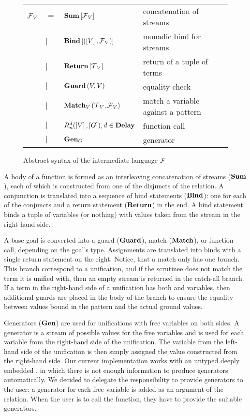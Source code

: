 \begin{figure}[h]
\begin{tabular}{llll}
    $\operatorname{\mathcal{F}}_{V}$ & $=$ & $\operatorname{\mathbf{Sum}}\left[ \operatorname{\mathcal{F}}_{V} \right]$ & concatenation of streams\\
               & $\mid$ & $\operatorname{\mathbf{Bind}}\left[ \left(\left[ V \right], \operatorname{\mathcal{F}}_{V}\right) \right] $ & monadic bind for streams\\
               & $\mid$ & $\operatorname{\mathbf{Return}} \left[ \operatorname{\mathcal{T}}_{V} \right]$ & return of a tuple of terms\\
               & $\mid$ & $\operatorname{\mathbf{Guard}}\left( V, V \right)$ & equality check\\
               & $\mid$ & $\operatorname{\mathbf{Match}}_{V} \left( \operatorname{\mathcal{T}}_{V}, \operatorname{\mathcal{F}}_{V} \right)$ & match a variable against a pattern\\
               & $\mid$ & $R_{n}^{d}(\left[ V \right], \left[ G \right]), d\in \operatorname{\mathbf{Delay}} $ & function call\\
               & $\mid$ & $\operatorname{\mathbf{Gen}}_{G}$ & generator
\end{tabular}
\caption{Abstract syntax of the intermediate language $\operatorname{\mathcal{F}}$}
\label{fig:intermediate}
\end{figure}


A body of a function is formed as an interleaving concatenation of streams ($\operatorname{\mathbf{Sum}}$), each of which is constructed from one of the disjuncts of the relation.
A conjunction is translated into a sequence of bind statements ($\operatorname{\mathbf{Bind}}$): one for each of the conjuncts and a return statement ($\operatorname{\mathbf{Return}}$) in the end.
A bind statement binds a tuple of variables (or nothing) with values taken from the stream in the right-hand side.

A base goal is converted into a guard ($\operatorname{\mathbf{Guard}}$), match ($\operatorname{\mathbf{Match}}$), or function call, depending on the goal's type.
Assignments are translated into binds with a single return statement on the right.
Notice, that a match only has one branch.
This branch correspond to a unification, and if the scrutinee does not match the term it is unified with, then an empty stream is returned in the catch-all branch.
If a term in the right-hand side of a unification has both \outm and \inm variables, then additional guards are placed in the body of the branch to ensure the equality between values bound in the pattern and the actual ground values.

Generators ($\operatorname{\mathbf{Gen}}$) are used for unifications with free variables on both sides.
A generator is a stream of possible values for the free variables and is used for each variable from the right-hand side of the unification.
The variable from the left-hand side of the unification is then simply assigned the value constructed from the right-hand side.
Our current implementation works with an untyped deeply embedded \mk, in which there is not enough information to produce generators automatically.
We decided to delegate the responsibility to provide generators to the user: a generator for each free variable is added as an argument of the relation.
When the user is to call the function, they have to provide the suitable generators.

